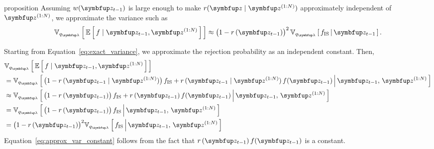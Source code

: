 
\begin{theoremEnd}{proposition}\label{thm:approx_var}
  Assuming \(w(\vz_{t-1})\) is large enough to make \(r(\vz\mid\vz^{(1:N)})\) approximately independent of \(\vz^{(1:N)}\), we approximate the variance such as
  \begin{align}
    \Vsub{q_{\vlambda}}{ \E{ f \mid \vz_{t-1}, \vz^{(1:N)} } } \approx {\big(1 - r\,(\vz_{t-1})\big)}^2\,\Vsub{q_{\vlambda}}{ f_{\text{IS}} \,\middle\vert\, \vz_{t-1} }.
  \end{align}
\end{theoremEnd}
\begin{proofEnd}
  Starting from Equation~\eqref{eq:exact_variance}, we approximate the rejection probability as an independent constant.
  Then,
  \begin{align}
    &\Vsub{q_{\vlambda}}{ \E{ f \mid \vz_{t-1}, \vz^{(1:N)} } } \\
    &= \Vsub{q_{\vlambda}}{ \big(1 - r\,(\vz_{t-1}\mid\vz^{(1:N)})\big)\, f_{\mathrm{IS}}
      + r\,(\vz_{t-1}\mid\vz^{(1:N)})\,f(\vz_{t-1}) \,\middle\vert\, \vz_{t-1},\, \vz^{(1:N)} } \\
    &\approx \Vsub{q_{\vlambda}}{ \big(1 - r\,(\vz_{t-1})\big)\, f_{\mathrm{IS}}
      + r\,(\vz_{t-1})\,f(\vz_{t-1}) \,\middle\vert\, \vz_{t-1},\, \vz^{(1:N)} } \\
    &= \Vsub{q_{\vlambda}}{ \big(1 - r\,(\vz_{t-1})\big)\, f_{\mathrm{IS}} \,\middle\vert\, \vz_{t-1},\, \vz^{(1:N)} } \label{eq:approx_var_constant} \\
    &= {\big(1 - r\,(\vz_{t-1})\big)}^2 \Vsub{q_{\vlambda}}{ f_{\mathrm{IS}} \,\middle\vert\, \vz_{t-1},\, \vz^{(1:N)} } \label{eq:approx_var_linear} 
  \end{align}
  Equation~\eqref{eq:approx_var_constant} follows from the fact that \(r\,(\vz_{t-1})\,f(\vz_{t-1})\) is a constant.
\end{proofEnd}

